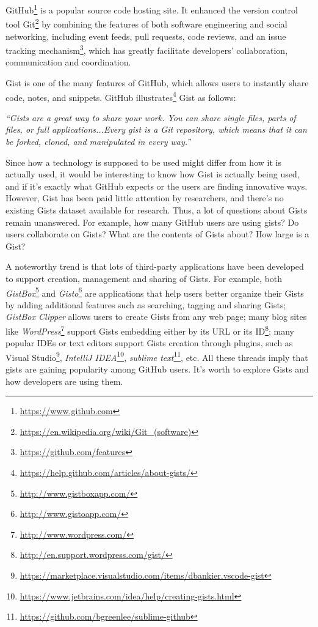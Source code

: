 
GitHub\footnote{\url{https://www.github.com}} is a popular source code hosting site. It enhanced the version control tool Git\footnote{\url{https://en.wikipedia.org/wiki/Git_(software)}} by combining the features of both software engineering and social networking, including event feeds, pull requests, code reviews,
and an issue tracking mechanism\footnote{\url{https://github.com/features}}, which has greatly facilitate developers' collaboration, communication and coordination.  

Gist is one of the many features of GitHub, which allows users to instantly share code, notes, and snippets. GitHub illustrates\footnote{\url{https://help.github.com/articles/about-gists/}} Gist as follows:

\textsl{``Gists are a great way to share your work. You can share single files, parts of files, or full applications...Every gist is a Git repository, which means that it can be forked, cloned, and manipulated in every way.''}

Since how a technology is supposed to be used might differ from how it is actually used, it would be interesting to know how Gist is actually being used, and if it's exactly what GitHub expects or the users are finding innovative ways. However, Gist has been paid little attention by researchers, and there's no existing Gists dataset available for research. Thus, a lot of questions about Gists remain unanswered. For example, how many GitHub users are using gists? Do users collaborate on Gists? What are the contents of Gists about? How large is a Gist? 

A noteworthy trend is that lots of third-party applications have been developed to support creation, management and sharing of Gists. For example, both \textit{GistBox}\footnote{\url{http://www.gistboxapp.com/}} and \textit{Gisto}\footnote{\url{http://www.gistoapp.com/}} are applications that help users better organize their Gists by adding additional features such as searching, tagging and sharing Gists; \textit{GistBox Clipper} allows users to create Gists from any web page; many blog sites like \textit{WordPress}\footnote{\url{http://www.wordpress.com/}} support Gists embedding either by its URL or its ID\footnote{\url{http://en.support.wordpress.com/gist/}}; many popular IDEs or text editors support Gists creation through plugins, such as Visual Studio\footnote{\url{https://marketplace.visualstudio.com/items/dbankier.vscode-gist}}, \textit{IntelliJ IDEA}\footnote{\url{https://www.jetbrains.com/idea/help/creating-gists.html}}, \textit{sublime text}\footnote{\url{https://github.com/bgreenlee/sublime-github}}, etc. All these threads imply that gists are gaining popularity among GitHub users. It's worth to explore Gists and how developers are using them.

